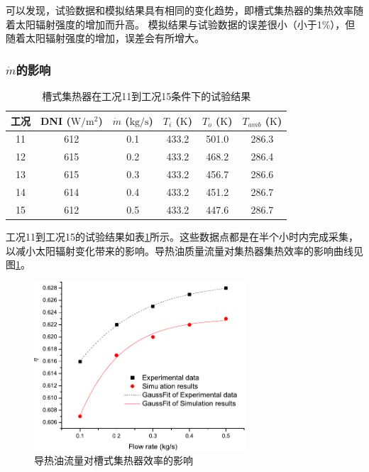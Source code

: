 可以发现，试验数据和模拟结果具有相同的变化趋势，即槽式集热器的集热效率随着太阳辐射强度的增加而升高。
模拟结果与试验数据的误差很小（小于1\%），但随着太阳辐射强度的增加，误差会有所增大。

\subsubsection{$\dot{m}$的影响}

\begin{table}[htbp]\footnotesize
	\caption{槽式集热器在工况11到工况15条件下的试验结果}
	\begin{center}
	\begin{tabular}{cccccc}
		\toprule
		工况	& DNI ($\mathrm{W/m^2}$)	&	$\dot{m}$ ($\mathrm{kg/s}$)			&	$T_i$ ($\mathrm{K}$)	&	$T_o$ ($\mathrm{K}$)		&	$T_{amb}$ ($\mathrm{K}$)\\
		\midrule
		11	&	612	&	0.1	&	433.2	&	501.0	&	286.3\\
		12	&	615	&	0.2	&	433.2	&	468.2	&	286.4\\
		13	&	615	&	0.3	&	433.2	&	456.7	&	286.6	\\
		14	&	614	&	0.4	&	433.2	&	451.2	&	286.7\\
		15	&	612	&	0.5	&	433.2	&	447.6	&	286.7\\
		\bottomrule
	\end{tabular}
	\end{center}
	\label{tab:ResultOfTrough2}
\end{table}
工况11到工况15的试验结果如表\ref{tab:ResultOfTrough2}所示。这些数据点都是在半个小时内完成采集，以减小太阳辐射变化带来的影响。导热油质量流量对集热器集热效率的影响曲线见图\ref{fig:q_m-eta-trough}。

\begin{figure}[!ht]
\centering
\includegraphics[width=0.7\textwidth]{fig/q_m-eta-trough}
\caption{导热油流量对槽式集热器效率的影响}
\label{fig:q_m-eta-trough}
\end{figure}

